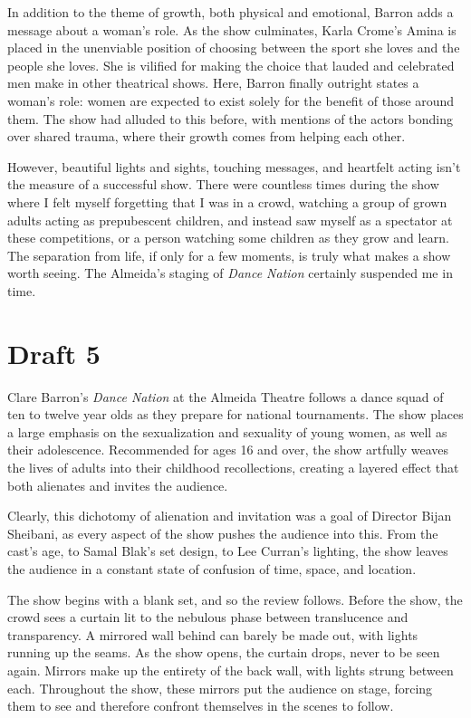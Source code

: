 \documentclass[12pt]{article}[titlepage]
\newcommand{\1}{\={a}}
\newcommand{\2}{\={e}}
\newcommand{\3}{\={\i}}
\newcommand{\4}{\=o}
\newcommand{\5}{\=u}
\newcommand{\6}{\={A}}
\renewcommand{\,}{\textsuperscript{,}}
\begin{document}
In addition to the theme of growth, both physical and emotional, Barron adds a message about a woman's role. As the show culminates, Karla Crome's Amina is placed in the unenviable position of choosing between the sport she loves and the people she loves. She is vilified for making the choice that lauded and celebrated men make in other theatrical shows. Here, Barron finally outright states a woman's role: women are expected to exist solely for the benefit of those around them. The show had alluded to this before, with mentions of the actors bonding over shared trauma, where their growth comes from helping each other.

However, beautiful lights and sights, touching messages, and heartfelt acting isn't the measure of a successful show. There were countless times during the show where I felt myself forgetting that I was in a crowd, watching a group of grown adults acting as prepubescent children, and instead saw myself as a spectator at these competitions, or a person watching some children as they grow and learn. The separation from life, if only for a few moments, is truly what makes a show worth seeing. The Almeida's staging of \textit{Dance Nation} certainly suspended me in time.

\section{Draft 5}
Clare Barron's \textit{Dance Nation} at the Almeida Theatre follows a dance squad of ten to twelve year olds as they prepare for national tournaments.
The show places a large emphasis on the sexualization and sexuality of young women, as well as their adolescence.
Recommended for ages 16 and over, the show artfully weaves the lives of adults into their childhood recollections, creating a layered effect that both alienates and invites the audience.

Clearly, this dichotomy of alienation and invitation was a goal of Director Bijan Sheibani, as every aspect of the show pushes the audience into this.
From the cast's age, to Samal Blak's set design, to Lee Curran's lighting, the show leaves the audience in a constant state of confusion of time, space, and location.

The show begins with a blank set, and so the review follows.
Before the show, the crowd sees a curtain lit to the nebulous phase between translucence and transparency.
A mirrored wall behind can barely be made out, with lights running up the seams.
As the show opens, the curtain drops, never to be seen again.
Mirrors make up the entirety of the back wall, with lights strung between each.
Throughout the show, these mirrors put the audience on stage, forcing them to see and therefore confront themselves in the scenes to follow.
\end{document}
